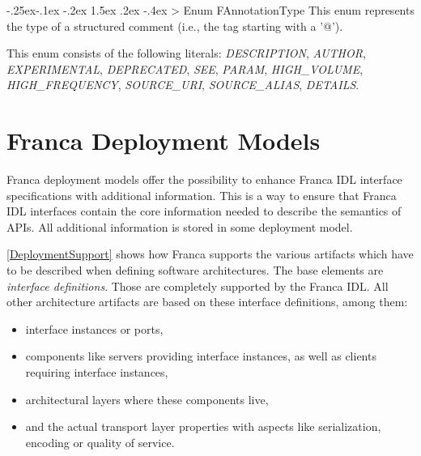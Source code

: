 \documentclass[a4paper,10pt]{scrreprt}
\makeatletter
\renewcommand\subsection{\medskip\@startsection{subsection}{2}{\z@}%
  {-.25ex\@plus -.1ex \@minus -.2ex}%
  {1.5ex \@plus .2ex \@minus -.4ex}%
  {\ifnum \scr@compatibility>\@nameuse{scr@v@2.96}\relax
    \setlength{\parfillskip}{\z@ plus 1fil}\fi
    \raggedsection\normalfont\sectfont\nobreak\size@subsection
  }%
}
\newlength{\XdocItemIndent}
\makeatother
\begin{document}
\subsection{Enum FAnnotationType}
\label{FrancaModelAPIReference_FAnnotationType}
This enum represents the type of a structured comment (i.e., the tag starting with a '@').

This enum consists of the following literals:  
\textit{DESCRIPTION}, \textit{AUTHOR}, \textit{EXPERIMENTAL}, \textit{DEPRECATED}, \textit{SEE}, \textit{PARAM}, \textit{HIGH\_VOLUME}, \textit{HIGH\_FREQUENCY}, \textit{SOURCE\_URI}, \textit{SOURCE\_ALIAS}, \textit{DETAILS}.


\chapter{Franca Deployment Models}
\label{DeploymentModels}
Franca deployment models offer the possibility to enhance Franca IDL interface
specifications with additional information. This is a way to ensure that Franca IDL
interfaces contain the core information needed to describe the semantics of APIs.
All additional information is stored in some deployment model.

\autoref{DeploymentSupport} shows how Franca supports the various artifacts which have
to be described when defining software architectures. The base elements are 
\textit{interface definitions}. Those are completely supported by the Franca IDL. 
All other architecture artifacts are based on these interface definitions,
among them:
\setlength{\XdocItemIndent}{\textwidth}
\begin{itemize}
\addtolength{\XdocItemIndent}{-2.5em}
\item \begin{minipage}[t]{\XdocItemIndent}
interface instances or ports,

\end{minipage}
\item \begin{minipage}[t]{\XdocItemIndent}
components like servers providing interface instances, as well as clients
		requiring interface	instances,

\end{minipage}
\item \begin{minipage}[t]{\XdocItemIndent}
architectural layers where these components live,

\end{minipage}
\item \begin{minipage}[t]{\XdocItemIndent}
and the actual transport layer properties with aspects like 
		serialization, encoding or quality of service.

\end{minipage}
\end{itemize}
\addtolength{\XdocItemIndent}{2.5em}
\end{document}
